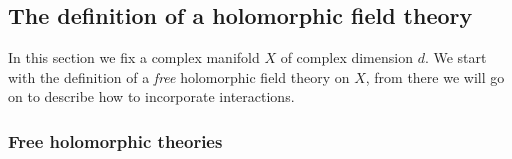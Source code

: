 \documentclass[11pt]{amsart}
\begin{document}
%
%
%
%

\subsection{The definition of a holomorphic field theory}

In this section we fix a complex manifold $X$ of complex dimension $d$. 
We start with the definition of a {\em free} holomorphic field theory on $X$, from there we will go on to describe how to incorporate interactions. 

\subsubsection{Free holomorphic theories}
\end{document}

